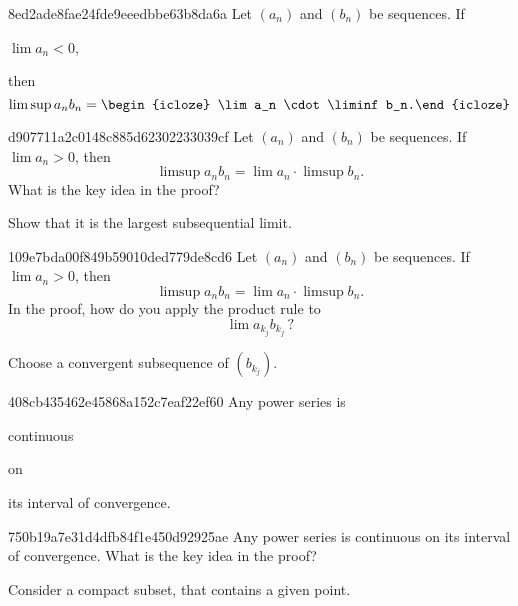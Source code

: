 \begin{note}{8ed2ade8fae24fde9eeedbbe63b8da6a}
    Let \({ (a_n) }\) and \({ (b_n) }\) be sequences.
    If \begin{icloze}{2}\({ \lim a_n < 0 }\),\end{icloze} then
    \[
        \limsup a_n b_n = \begin{icloze}{1}\lim a_n \cdot \liminf b_n.\end{icloze}
    \]
\end{note}

\begin{note}{d907711a2c0148c885d62302233039cf}
    Let \({ (a_n) }\) and \({ (b_n) }\) be sequences.
    If \({ \lim a_n > 0 }\), then
    \[
        \limsup a_n b_n = \lim a_n \cdot \limsup b_n.
    \]
    What is the key idea in the proof?

    \begin{cloze}{1}
        Show that it is the largest subsequential limit.
    \end{cloze}
\end{note}

\begin{note}{109e7bda00f849b59010ded779de8cd6}
    Let \({ (a_n) }\) and \({ (b_n) }\) be sequences.
    If \({ \lim a_n > 0 }\), then
    \[
        \limsup a_n b_n = \lim a_n \cdot \limsup b_n.
    \]
    In the proof, how do you apply the product rule to
    \[
        \lim a_{k_j} b_{k_j}\,?
    \]

    \begin{cloze}{1}
        Choose a convergent subsequence of \({ (b_{k_j}) }\).
    \end{cloze}
\end{note}

\begin{note}{408cb435462e45868a152c7eaf22ef60}
    Any power series is \begin{icloze}{2}continuous\end{icloze} on \begin{icloze}{1}its interval of convergence.\end{icloze}
\end{note}

\begin{note}{750b19a7e31d4dfb84f1e450d92925ae}
    Any power series is continuous on its interval of convergence.
    What is the key idea in the proof?

    \begin{cloze}{1}
        Consider a compact subset, that contains a given point.
    \end{cloze}
\end{note}

